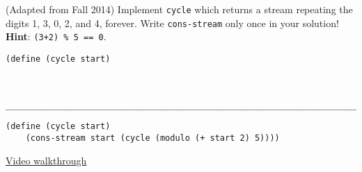 \question (Adapted from Fall 2014) Implement \texttt{cycle} which returns a
stream repeating the digits 1, 3, 0, 2, and 4, forever. Write \texttt{cons-stream} only once in your solution!\\
\textbf{Hint}: \lstinline$(3+2) % 5 == 0$.

\begin{lstlisting}
(define (cycle start)


    ______________________________________________________________________________)
\end{lstlisting}

\begin{solution}[0in]
\begin{lstlisting}
(define (cycle start)
    (cons-stream start (cycle (modulo (+ start 2) 5))))
\end{lstlisting}
\href{https://youtu.be/Qde_PiKUoA4?t=6m11s}{Video walkthrough}
\end{solution}
